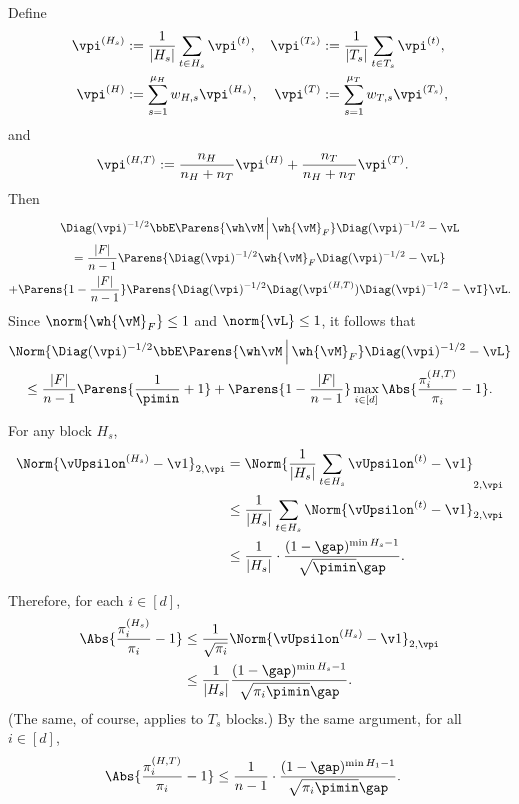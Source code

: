Define
\begin{align*}
  \vpi^{(H_s)} & := \frac1{|H_s|} \sum_{t \in H_s} \vpi^{(t)} ,
  & \vpi^{(T_s)} & := \frac1{|T_s|} \sum_{t \in T_s} \vpi^{(t)} , \\
  \vpi^{(H)} & := \sum_{s=1}^{\mu_H} w_{H,s} \vpi^{(H_s)} ,
  & \vpi^{(T)} & := \sum_{s=1}^{\mu_T} w_{T,s} \vpi^{(T_s)} ,
\end{align*}
and
\begin{align*}
  \vpi^{(H,T)} & :=
  \frac{n_H}{n_H + n_T} \vpi^{(H)}
  + \frac{n_T}{n_H + n_T} \vpi^{(T)}
  .
\end{align*}
Then
\begin{multline*}
  \Diag(\vpi)^{-1/2}
  \bbE\Parens{ \wh\vM \,\Big\vert\, \wh{\vM}_F }
  \Diag(\vpi)^{-1/2} - \vL
  \\
  =
  \frac{|F|}{n-1}\Parens{
    \Diag(\vpi)^{-1/2} \wh{\vM}_F \Diag(\vpi)^{-1/2} - \vL
  }
  \\
  + \Parens{ 1 - \frac{|F|}{n-1} }
  \Parens{
    \Diag(\vpi)^{-1/2} \Diag(\vpi^{(H,T)}) \Diag(\vpi)^{-1/2} - \vI
  } \vL
  .
\end{multline*}
Since $\norm{\wh{\vM}_F} \leq 1$ and $\norm{\vL} \leq 1$, it follows
that
\begin{multline*}
  \Norm{
    \Diag(\vpi)^{-1/2}
    \bbE\Parens{ \wh\vM \,\Big\vert\, \wh{\vM}_F }
    \Diag(\vpi)^{-1/2} - \vL
  }
  \\
  \leq
  \frac{|F|}{n-1}
  \Parens{ \frac1{\pimin} + 1 }
  +
  \Parens{ 1 - \frac{|F|}{n-1} }
  \max_{i \in [d]} \Abs{ \frac{\pi_i^{(H,T)}}{\pi_i} - 1 }
  .
\end{multline*}

For any block $H_s$,
\begin{align*}
  \Norm{ \vUpsilon^{(H_s)} - \v1 }_{2,\vpi}
  & =
  \Norm{
    \frac1{|H_s|} \sum_{t \in H_s} \vUpsilon^{(t)} - \v1
  }_{2,\vpi}
  \\
  & \leq
  \frac1{|H_s|} \sum_{t \in H_s}
  \Norm{
    \vUpsilon^{(t)} - \v1
  }_{2,\vpi}
  \\
  & \leq \frac1{|H_s|} \cdot \frac{(1-\gap)^{\min H_s -
  1}}{\sqrt{\pimin}\gap}
  .
\end{align*}

Therefore, for each $i \in [d]$,
\begin{align*}
  \Abs{ \frac{\pi_i^{(H_s)}}{\pi_i} - 1 }
  & \leq
  \frac1{\sqrt{\pi_i}}
  \Norm{ \vUpsilon^{(H_s)} - \v1 }_{2,\vpi}
  \\
  & \leq
  \frac1{|H_s|}
  \frac{(1-\gap)^{\min H_s - 1}}{\sqrt{\pi_i\pimin}\gap}
  .
\end{align*}
(The same, of course, applies to $T_s$ blocks.)
By the same argument, for all $i \in [d]$,
\begin{align*}
  \Abs{ \frac{\pi_i^{(H,T)}}{\pi_i} - 1 }
  & \leq \frac1{n-1} \cdot \frac{(1-\gap)^{\min H_1 -
  1}}{\sqrt{\pi_i\pimin}\gap}
  .
\end{align*}

